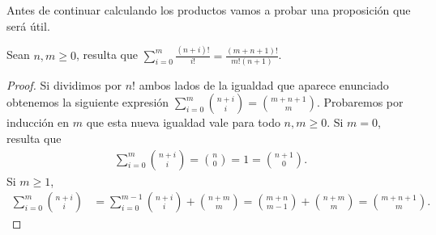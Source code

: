 \documentclass[fleqn,../tesis.tex]{subfiles}
\begin{document}
Antes de continuar calculando los productos vamos a probar una proposición que será
útil.

\begin{prop}\label{combinatorio_recursivo}
	Sean $n, m\geq 0$, resulta que
	$\sum_{i = 0}^{m}\frac{(n + i)!}{i!} = \frac{(m + n + 1)!}{m!(n + 1)}$.
\end{prop}
\begin{proof}
	Si dividimos por $n!$ ambos lados de la igualdad que aparece enunciado obtenemos
	la siguiente expresión $\sum_{i = 0}^{m}\binom{n + i}{i} = \binom{m + n + 1}{m}$.
	Probaremos por inducción en $m$ que esta nueva igualdad vale para todo $n,m \geq 0$.
	Si $m = 0$, resulta que
	\begin{align*}
		\sum_{i = 0}^{m}\binom{n + i}{i} = \binom{n}{0} = 1 = \binom{n + 1}{0}.
	\end{align*}
	Si $m \geq 1$,
	\begin{align*}
		\sum_{i = 0}^{m}\binom{n + i}{i} &= \sum_{i = 0}^{m - 1}\binom{n + i}{i} + \binom{n + m}{m}
			= \binom{m + n}{m - 1} + \binom{n + m}{m} = \binom{m + n + 1}{m}.
	\end{align*}
\end{proof}
\end{document}
